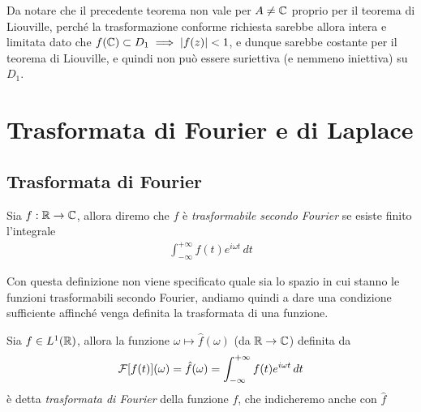 Da notare che il precedente teorema non vale per $ A \neq \mathbb{C} $ proprio per il teorema di Liouville, perché la trasformazione conforme richiesta sarebbe 
allora intera e limitata dato che $ f(\mathbb{C}) \subset D_1 \implies \left|{f(z)}\right| < 1 $, e dunque sarebbe costante per il teorema di Liouville, e quindi non può 
essere suriettiva (e nemmeno iniettiva) su $ D_1 $.

\chapter{Trasformata di Fourier e di Laplace}

\section{Trasformata di Fourier}

\begin{definition}
  Sia $ f:\mathbb{R} \to \mathbb{C} $, allora diremo che $ f $ è \textit{trasformabile secondo Fourier} se esiste finito l'integrale 
  \begin{align}
    \int_{-\infty}^{+\infty} f(t) e^{i\omega t} \,dt
  \end{align}
\end{definition}

Con questa definizione non viene specificato quale sia lo spazio in cui stanno le funzioni trasformabili secondo Fourier, andiamo quindi a dare 
una condizione sufficiente affinché venga definita la trasformata di una funzione.

\begin{definition}
  Sia $ f \in L^1(\mathbb{R}) $, allora la funzione $ \omega \mapsto \hat{f}(\omega) $ (da $ \mathbb{R} \to \mathbb{C} $) definita da 
  \begin{align}
    \operatorname{\mathcal{F}}[f(t)](\omega) = \hat{f}(\omega) = \int_{-\infty}^{+\infty} f(t) e^{i\omega t} \,dt
  \end{align}
  è detta \textit{trasformata di Fourier} della funzione $ f $, che indicheremo anche con $ \hat{f} $
\end{definition}

